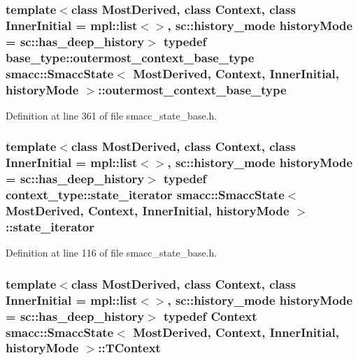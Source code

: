 \subsubsection[{\texorpdfstring{outermost\+\_\+context\+\_\+base\+\_\+type}{outermost_context_base_type}}]{\setlength{\rightskip}{0pt plus 5cm}template$<$class Most\+Derived, class Context, class Inner\+Initial = mpl\+::list$<$$>$, sc\+::history\+\_\+mode history\+Mode = sc\+::has\+\_\+deep\+\_\+history$>$ typedef base\+\_\+type\+::outermost\+\_\+context\+\_\+base\+\_\+type {\bf smacc\+::\+Smacc\+State}$<$ Most\+Derived, Context, Inner\+Initial, history\+Mode $>$\+::{\bf outermost\+\_\+context\+\_\+base\+\_\+type}}\hypertarget{classsmacc_1_1SmaccState_aaf76bbe2aa9dd73e3284605f84ab4b16}{}\label{classsmacc_1_1SmaccState_aaf76bbe2aa9dd73e3284605f84ab4b16}


Definition at line 361 of file smacc\+\_\+state\+\_\+base.\+h.

\subsubsection[{\texorpdfstring{state\+\_\+iterator}{state_iterator}}]{\setlength{\rightskip}{0pt plus 5cm}template$<$class Most\+Derived, class Context, class Inner\+Initial = mpl\+::list$<$$>$, sc\+::history\+\_\+mode history\+Mode = sc\+::has\+\_\+deep\+\_\+history$>$ typedef context\+\_\+type\+::state\+\_\+iterator {\bf smacc\+::\+Smacc\+State}$<$ Most\+Derived, Context, Inner\+Initial, history\+Mode $>$\+::{\bf state\+\_\+iterator}}\hypertarget{classsmacc_1_1SmaccState_a12497b38e710f07cacb5d45efc024339}{}\label{classsmacc_1_1SmaccState_a12497b38e710f07cacb5d45efc024339}


Definition at line 116 of file smacc\+\_\+state\+\_\+base.\+h.

\subsubsection[{\texorpdfstring{T\+Context}{TContext}}]{\setlength{\rightskip}{0pt plus 5cm}template$<$class Most\+Derived, class Context, class Inner\+Initial = mpl\+::list$<$$>$, sc\+::history\+\_\+mode history\+Mode = sc\+::has\+\_\+deep\+\_\+history$>$ typedef Context {\bf smacc\+::\+Smacc\+State}$<$ Most\+Derived, Context, Inner\+Initial, history\+Mode $>$\+::{\bf T\+Context}}\hypertarget{classsmacc_1_1SmaccState_a9953ba0428a8c46f7d72c70bc3f87db4}{}\label{classsmacc_1_1SmaccState_a9953ba0428a8c46f7d72c70bc3f87db4}


